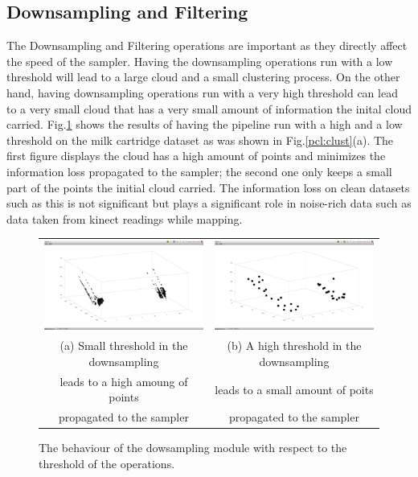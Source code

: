 \documentclass[twoside,hidelinks]{article}
\begin{document}
\subsection{Downsampling and Filtering}

The Downsampling and Filtering operations are important as they directly affect the speed of the sampler. Having the downsampling operations run with a low threshold will lead to a large cloud and a small clustering process. On the other hand, having downsampling operations run with a very high threshold can lead to a very small cloud that has a very small amount of information the inital cloud carried. Fig.\ref{pip:downsample} shows the results of having the pipeline run with a high and a low threshold on the milk cartridge dataset as was shown in Fig.\ref{pcl:clust}(a). The first figure displays the cloud has a high amount of points and minimizes the information loss propagated to the sampler; the second one only keeps a small part of the points the initial cloud carried. The information loss on clean datasets such as this is not significant but plays a significant role in noise-rich data such as data taken from kinect readings while mapping.


\begin{figure}[!ht]
\begin{tabular}{cc}
    \includegraphics[width=.4\textwidth]{smalldownsamplinglimit} &  \includegraphics[width=.4\textwidth]{largedownsamplinglimit} \\
    (a) Small threshold in the downsampling  & (b) A high threshold in the downsampling  \\
        leads to  a high amoung of points    &     leads to a small amount of poits \\
        propagated to the sampler            &     propagated to the sampler  \\[6pt]
\end{tabular}
\caption{The behaviour of the dowsampling module with respect to the threshold of the operations.}
  \label{pip:downsample}
\end{figure}
\end{document}
